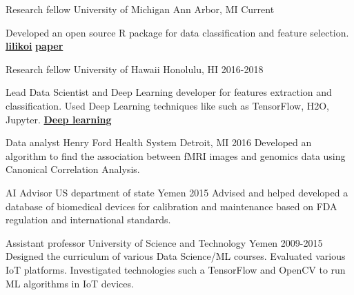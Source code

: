 \begin{cventries}

  \cventry
    {Research fellow}
    {University of Michigan}
    {Ann Arbor, MI}
    {Current}
    {
    
 Developed an open source R package for data classification and feature selection. \href{https://github.com/FADHLyemen/lilikoi_summary}{\textbf{lilikoi}}
 \href{https://academic.oup.com/gigascience/article/7/12/giy136/5237705}{\textbf{paper}}
   
    }

  \cventry
    {Research fellow}
    {University of Hawaii}
    {Honolulu, HI}
    {2016-2018}
    {
     Lead Data Scientist and Deep Learning developer for features extraction and classification. Used
    Deep Learning techniques like such as TensorFlow, H2O, Jupyter.
    \href{ https://www.ncbi.nlm.nih.gov/pubmed/29110491}{\textbf{Deep learning}}
   
    }

  \cventry
    {Data analyst}
    {Henry Ford Health System}
    {Detroit, MI}
    {2016}
    {
      Developed an algorithm to find the association between fMRI images and genomics data using Canonical Correlation Analysis. 
    }

  \cventry
    {AI Advisor}
    {US department of state}
    {Yemen}
    {2015}
    {
    Advised and helped developed a database of biomedical devices for calibration and maintenance based on FDA regulation and international standards.
    }

  \cventry
    {Assistant professor}
    {University of Science and Technology}
    {Yemen}
    {2009-2015}
    {
    Designed the curriculum of various
    Data Science/ML courses. Evaluated various IoT platforms. Investigated
    technologies such a TensorFlow and OpenCV to run ML algorithms in IoT
    devices.
    }


\end{cventries}


